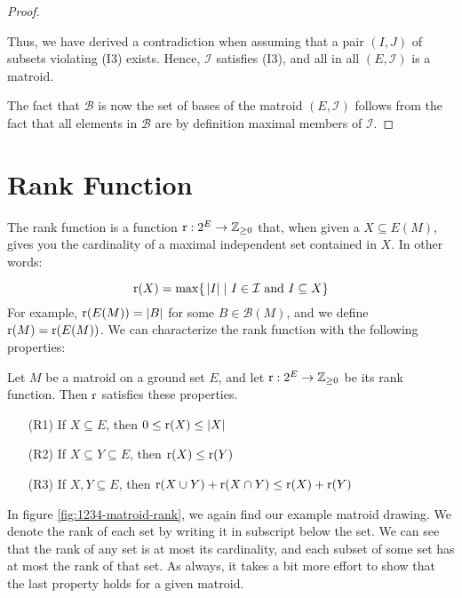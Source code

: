 \begin{proof}
\begin{enumerate}
        Thus, we have derived a contradiction when assuming that a pair $(I, J)$ of subsets violating (I3) exists. Hence, $\mathcal{I}$ satisfies (I3), and all in all $(E,\mathcal{I})$ is a matroid.
    \end{enumerate}  

    
    The fact that $\mathcal{B}$ is now the set of bases of the matroid $(E,\mathcal{I})$ follows from the fact that all elements in $\mathcal{B}$ are by definition maximal members of $\mathcal{I}$.
\end{proof}

\newpage



\newpage
\section{Rank Function}

The rank function is a function $\operatorname{r} :2^E \rightarrow \mathbb{Z}_{\geq0}$ that, when given a $X\subseteq E(M)$, gives you the cardinality of a maximal independent set contained in $X$. In other words:

$$ \operatorname{r}(X) = \max\{\, |I| \; | \,\, I\in\mathcal{I} \text{ and } I\subseteq X \} $$
For example, $\operatorname{r}(E(M))=|B|$ for some $B\in\mathcal{B}(M)$, and we define $\operatorname{r}(M) = \operatorname{r}(E(M))$. We can characterize the rank function with the following properties:

\begin{theorem}
    Let $M$ be a matroid on a ground set $E$, and let $\operatorname{r} : 2^E \rightarrow \mathbb{Z}_{\geq0}$ be its rank function. Then $\operatorname{r}$ satisfies these properties.
    \begin{enumerate}
        \item[(R1)] If $X\subseteq E$, then $0 \leq \operatorname{r}(X) \leq |X| $
        \item[(R2)] If $X\subseteq Y\subseteq E$, then $\operatorname{r}(X)\leq\operatorname{r}(Y)$
        \item[(R3)] If $X,Y\subseteq E$, then $\operatorname{r}(X\cup Y)+\operatorname{r}(X\cap Y) \leq \operatorname{r}(X)+\operatorname{r}(Y) $
    \end{enumerate}
\end{theorem}

In figure \ref{fig:1234-matroid-rank}, we again find our example matroid drawing. We denote the rank of each set by writing it in subscript below the set. We can see that the rank of any set is at most its cardinality, and each subset of some set has at most the rank of that set. As always, it takes a bit more effort to show that the last property holds for a given matroid.

